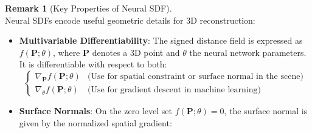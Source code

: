 \documentclass[12pt,a4paper]{article}
\theoremstyle{definition}
\newtheorem{remark}{Remark}[subsection]
\begin{document}
\begin{remark}[Key Properties of Neural SDF] \label{rmk:gradient_properties} ~\\
Neural SDFs encode useful geometric details for 3D reconstruction:
\begin{itemize}

    \item \textbf{Multivariable Differentiability}: The signed distance field is expressed as \( f(\mathbf{P}; \theta) \), where \(\mathbf{P}\) denotes a 3D point and \(\theta\) the neural network parameters. 
    It is differentiable with respect to both:
    \vspace{-1em}
    \[
    \begin{cases}
        \nabla_{\mathbf{P}} f(\mathbf{P}; \theta) & \text{(Use for spatial constraint or surface normal in the scene)} \\
        \nabla_{\theta} f(\mathbf{P}; \theta) & \text{(Use for gradient descent in machine learning)}
    \end{cases}
    \]

    \item \textbf{Surface Normals}: 
    On the zero level set \(f(\mathbf{P}; \theta) = 0\), the surface normal is given by the normalized spatial gradient:
    

\end{itemize}
\end{remark}
\end{document}
